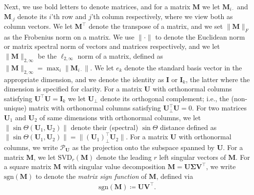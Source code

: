 \documentclass[10pt]{article}
\newcommand{\0}{{\mathbf{0}}}
\newcommand{\1}{{\mathbf{1}}}
\newcommand{\U}{{\mathbf{U}}}
\renewcommand{\t}{^{\top}}
\begin{document}
Next, we use bold letters to denote matrices, and for a matrix $\mathbf{M}$ we let $\mathbf{M}_{i\cdot}$ and $\mathbf{M}_{\cdot j}$ denote its $i$'th row and $j$'th column respectively, where we view both as column vectors.  We let $\mathbf{M}\t$ denote the transpose of a matrix, and we set $\| \mathbf{M}\|_F$ as the Frobenius norm on a matrix.  We use $\|\cdot\|$ to denote the Euclidean norm or matrix spectral norm of vectors and matrices respectively, and we let $\|\mathbf{M}\|_{2,\infty}$ be the $\ell_{2,\infty}$ norm of a matrix, defined as $\|\mathbf{M}\|_{2,\infty} = \max_{i} \|\mathbf{M}_{i\cdot} \|$.  We let $e_k$ denote the standard basis vector in the appropriate dimension, and we denote the identity as $\mathbf{I}$ or $\mathbf{I}_k$, the latter where the dimension is specified for clarity.  For a matrix $\mathbf{U}$ with orthonormal columns  satisfying $\mathbf{U}\t \mathbf{U} = \mathbf{I}_k$ we let $\mathbf{U}_{\perp}$ denote its orthogonal complement; i.e., the (non-unique) matrix with orthonormal columns satisfying $\mathbf{U}_{\perp}\t \mathbf{U} = 0$.  For two matrices $\U_1$ and $\U_2$ of same dimensions with orthonormal columns, we let $\|\sin\Theta(\U_1,\U_2)\|$ denote their (spectral) $\sin\Theta$ distance defined as $\|\sin\Theta(\U_1,\U_2)\| = \| (\mathbf{\U}_1)_{\perp}\t \U_2 \|$. For a matrix $\U$ with orthonormal columns, we write $\mathcal{P}_{\U}$ as the projection onto the subspace spanned by  $\U$. For a matrix $\mathbf{M}$, we let $\mathrm{SVD}_r(\mathbf{M})$ denote the leading $r$ left singular vectors of $\mathbf{M}$.  For a square matrix $\mathbf{M}$ with singular value decomposition $\mathbf{M} = \mathbf{U \Sigma V}\t$, we write $\mathrm{sgn}(\mathbf{M})$ to denote the \emph{matrix sign function} of $\mathbf{M}$, defined via
\begin{align}
    \mathrm{sgn}(\mathbf{M}) \coloneqq \mathbf{UV}\t. \label{sgnfunction}
\end{align}
\end{document}
